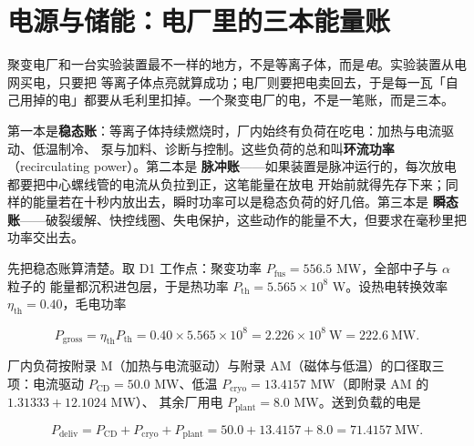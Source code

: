 \section{电源与储能：电厂里的三本能量账}
\label{sec:app-ar-chain}

聚变电厂和一台实验装置最不一样的地方，不是等离子体，而是\emph{电}。实验装置从电网买电，只要把
等离子体点亮就算成功；电厂则要把电卖回去，于是每一瓦「自己用掉的电」都要从毛利里扣掉。一个聚变电厂的电，不是一笔账，而是三本。

第一本是\textbf{稳态账}：等离子体持续燃烧时，厂内始终有负荷在吃电：加热与电流驱动、低温制冷、
泵与加料、诊断与控制。这些负荷的总和叫\textbf{环流功率}（recirculating power）。第二本是
\textbf{脉冲账}——如果装置是脉冲运行的，每次放电都要把中心螺线管的电流从负拉到正，这笔能量在放电
开始前就得先存下来；同样的能量若在十秒内放出去，瞬时功率可以是稳态负荷的好几倍。第三本是
\textbf{瞬态账}——破裂缓解、快控线圈、失电保护，这些动作的能量不大，但要求在毫秒里把功率交出去。

先把稳态账算清楚。取 D1 工作点：聚变功率 $P_\mathrm{fus}=556.5$ MW，全部中子与 $\alpha$ 粒子的
能量都沉积进包层，于是热功率 $P_\mathrm{th}=5.565\times10^{8}$ W。设热电转换效率
$\eta_\mathrm{th}=0.40$，毛电功率

\begin{equation}
P_\mathrm{gross}=\eta_\mathrm{th}P_\mathrm{th}=0.40\times5.565\times10^{8}
=2.226\times10^{8}\ \mathrm{W}=222.6\ \mathrm{MW}.
\label{eq:app-ar-gross}
\end{equation}

厂内负荷按附录 M（加热与电流驱动）与附录 AM（磁体与低温）的口径取三项：电流驱动
$P_\mathrm{CD}=50.0$ MW、低温 $P_\mathrm{cryo}=13.4157$ MW（即附录 AM 的 $1.31333+12.1024$ MW）、
其余厂用电 $P_\mathrm{plant}=8.0$ MW。送到负载的电是

\begin{equation}
P_\mathrm{deliv}=P_\mathrm{CD}+P_\mathrm{cryo}+P_\mathrm{plant}
=50.0+13.4157+8.0=71.4157\ \mathrm{MW}.
\label{eq:app-ar-deliv}
\end{equation}

